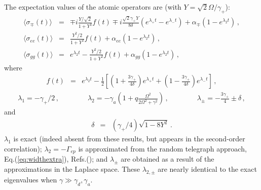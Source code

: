 \documentclass[twocolumn,aps,eqsecnum,showkeys,amsmath]{revtex4-2}
\begin{document}
\begin{widetext}
The expectation values of the atomic operators are (with 
$Y =\sqrt{2} \Omega/\gamma_+$):  
%
\begin{subequations} 	\label{eq:BlochSols}
\begin{eqnarray} 	
\langle \sigma_{\mp} (t) \rangle 
&=& 	\mp i \frac{ Y/ \sqrt{2} }{1+Y^2}  f(t)  
\mp i  \frac{ \sqrt{2} \gamma_+ Y }{8 \delta} 
	\left( e^{\lambda_+ t} -e^{\lambda_- t} \right) 	
	+\alpha_{\mp} \left( 1- e^{\lambda_2 t} \right) \,,  \\   
%
\langle \sigma_{ee} (t) \rangle &=& 	
   \frac{ Y^2/2 }{1+ Y^2} f(t) +\alpha_{ee} \left( 1- e^{\lambda_2 t} \right) \,, 	\\ 
%
\langle \sigma_{gg} (t) \rangle 
	&=& e^{\lambda_2 t}  -\frac{ Y^2/2 }{1+ Y^2} f(t)    
  	+\alpha_{gg} \left( 1- e^{\lambda_2 t} \right) \,, 	 
\end{eqnarray}
\end{subequations} 
where 
%
\begin{eqnarray} 	
f(t) &=& e^{\lambda_2 t} -\frac{1}{2}  \left[ 
	\left( 1+\frac{3 \gamma_+}{4 \delta} \right) e^{\lambda_+ t}  	
+ \left( 1-\frac{3 \gamma_+}{4 \delta} \right) e^{\lambda_- t}  \right]   \,, 
\end{eqnarray}
%
\begin{eqnarray} 	\label{eq:eigenvalues}
\lambda_1 = -\gamma_+/2 \,, 	\qquad \qquad 
\lambda_2 = -\gamma_a \left( 1+ q \frac{\Omega^2 }
	{ 2 \Omega^2 +\gamma^2 }  \right)  \,, 	\qquad \qquad 
\lambda_{\pm} = -\frac{3\gamma_+}{4} \pm \delta  \,,  
\end{eqnarray} 
and 
%
\begin{eqnarray} 	
\delta &=& (\gamma_+/4) \sqrt{1-8Y^2} 	\,. 
\end{eqnarray}
$\lambda_1$ is exact (indeed absent from these results, but appears in the 
second-order correlation); $\lambda_2 = -\Gamma_{ep}$ is approximated 
from the random telegraph approach, Eq.(\ref{eq:widthextra}), 
Refs.(\cite{EvKe02,PeKn88a}); and $\lambda_{\pm}$ are obtained as a 
result of the approximations in the Laplace space. These 
$\lambda_{2,\pm}$ are nearly identical to the exact eigenvalues when 
$\gamma \gg \gamma_d,\gamma_a$. 



\end{widetext}
\end{document}
